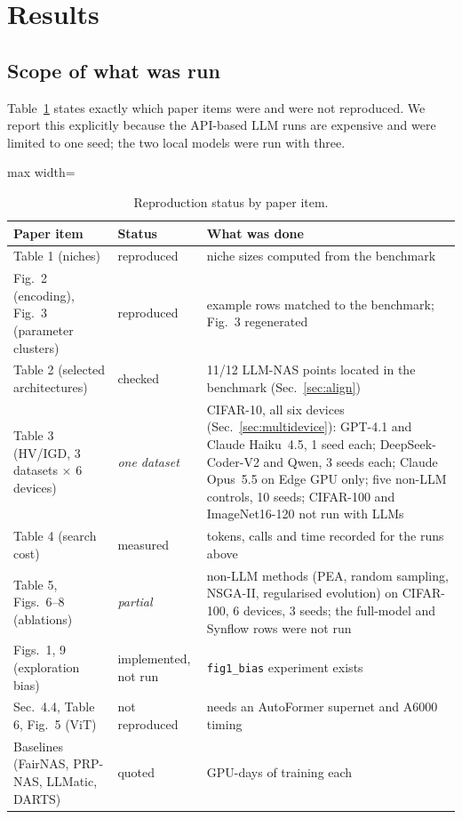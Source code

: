 \documentclass[preprint,12pt]{elsarticle}
\newcommand{\code}[1]{\texttt{#1}}
\begin{document}
\section{Results}\label{sec:results}

\subsection{Scope of what was run}
Table~\ref{tab:scope} states exactly which paper items were and were not reproduced. We report this explicitly because the API-based LLM runs are expensive and were limited to one seed; the two local models were run with three.
\begin{table}[h]\centering\small
\caption{Reproduction status by paper item.}\label{tab:scope}
\begin{adjustbox}{max width=\linewidth}
\begin{tabular}{p{4.3cm}p{2.3cm}p{8.1cm}}
\toprule
Paper item & Status & What was done \\
\midrule
Table 1 (niches) & reproduced & niche sizes computed from the benchmark \\
Fig.~2 (encoding), Fig.~3 (parameter clusters) & reproduced & example rows matched to the benchmark; Fig.~3 regenerated \\
Table 2 (selected architectures) & checked & 11/12 LLM-NAS points located in the benchmark (Sec.~\ref{sec:align}) \\
Table 3 (HV/IGD, 3 datasets $\times$ 6 devices) & \emph{one dataset} & CIFAR-10, all six devices (Sec.~\ref{sec:multidevice}): GPT-4.1 and Claude Haiku~4.5, 1 seed each; DeepSeek-Coder-V2 and Qwen, 3 seeds each; Claude Opus~5.5 on Edge GPU only; five non-LLM controls, 10 seeds; CIFAR-100 and ImageNet16-120 not run with LLMs \\
Table 4 (search cost) & measured & tokens, calls and time recorded for the runs above \\
Table 5, Figs.~6--8 (ablations) & \emph{partial} & non-LLM methods (PEA, random sampling, NSGA-II, regularised evolution) on CIFAR-100, 6 devices, 3 seeds; the full-model and Synflow rows were not run \\
Figs.~1, 9 (exploration bias) & implemented, not run & \code{fig1\_bias} experiment exists \\
Sec.~4.4, Table 6, Fig.~5 (ViT) & not reproduced & needs an AutoFormer supernet and A6000 timing \\
Baselines (FairNAS, PRP-NAS, LLMatic, DARTS) & quoted & GPU-days of training each \\
\bottomrule
\end{tabular}
\end{adjustbox}
\end{table}
\end{document}

